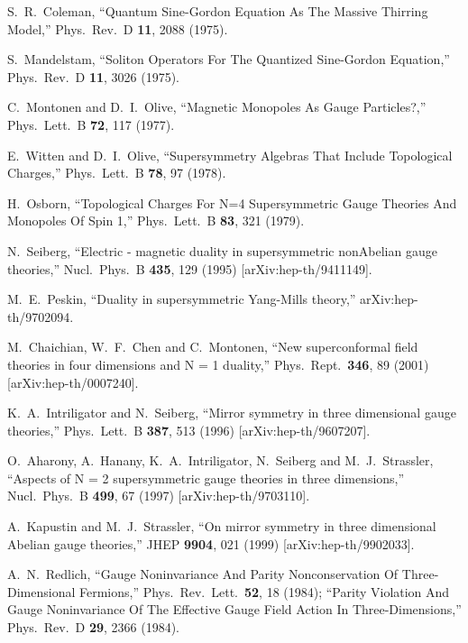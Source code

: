\documentclass[a4paper,12pt, amsfonts, amssymb]{article}
\begin{document}
\begin{thebibliography}{99}

S.~R.~Coleman, ``Quantum Sine-Gordon Equation As The Massive Thirring Model,''
Phys.\ Rev.\ D {\bf 11}, 2088 (1975).

S.~Mandelstam, ``Soliton Operators For The Quantized Sine-Gordon Equation,''
Phys.\ Rev.\ D {\bf 11}, 3026 (1975).

C.~Montonen and D.~I.~Olive,
``Magnetic Monopoles As Gauge Particles?,''
Phys.\ Lett.\ B {\bf 72}, 117 (1977).

E.~Witten and D.~I.~Olive,
``Supersymmetry Algebras That Include Topological Charges,''
Phys.\ Lett.\ B {\bf 78}, 97 (1978).

H.~Osborn,
``Topological Charges For N=4 Supersymmetric Gauge Theories And Monopoles Of Spin 1,'' Phys.\ Lett.\ B {\bf 83}, 321 (1979).

N.~Seiberg, ``Electric - magnetic duality in supersymmetric nonAbelian gauge theories,'' Nucl.\ Phys.\ B {\bf 435}, 129 (1995) [arXiv:hep-th/9411149].

M.~E.~Peskin, ``Duality in supersymmetric Yang-Mills theory,''
arXiv:hep-th/9702094.

M.~Chaichian, W.~F.~Chen and C.~Montonen,
``New superconformal field theories in four dimensions and N = 1 duality,''
Phys.\ Rept.\  {\bf 346}, 89 (2001)
[arXiv:hep-th/0007240].

K.~A.~Intriligator and N.~Seiberg,
``Mirror symmetry in three dimensional gauge theories,''
Phys.\ Lett.\ B {\bf 387}, 513 (1996)
[arXiv:hep-th/9607207].

O.~Aharony, A.~Hanany, K.~A.~Intriligator, N.~Seiberg and M.~J.~Strassler,
``Aspects of N = 2 supersymmetric gauge theories in three dimensions,''
Nucl.\ Phys.\ B {\bf 499}, 67 (1997)
[arXiv:hep-th/9703110].

A.~Kapustin and M.~J.~Strassler,
``On mirror symmetry in three dimensional Abelian gauge theories,''
JHEP {\bf 9904}, 021 (1999) [arXiv:hep-th/9902033].

A.~N.~Redlich, ``Gauge Noninvariance And Parity Nonconservation Of Three-Dimensional  Fermions,'' Phys.\ Rev.\ Lett.\  {\bf 52}, 18 (1984);
``Parity Violation And Gauge Noninvariance Of The Effective Gauge Field 
Action In Three-Dimensions,'' Phys.\ Rev.\ D {\bf 29}, 2366 (1984).


\end{thebibliography}
\end{document}
